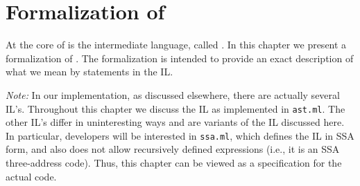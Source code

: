 \chapter{Formalization of \bil}

At the core of \bap is the \bap intermediate language, called \bil. In
this chapter we present a formalization of \bil. The formalization is
intended to provide an exact description of what we mean by statements
in the IL.

{\it Note:} In our implementation, as discussed elsewhere, there are
actually several IL's.  Throughout this chapter we discuss the IL as
implemented in {\tt ast.ml}.  The other IL's differ in uninteresting
ways and are variants of the IL discussed here. In particular,
developers will be interested in {\tt ssa.ml}, which defines the IL in
SSA form, and also does not allow recursively defined expressions
(i.e., it is an SSA three-address code).  Thus, this chapter can be
viewed as a specification for the actual code.





%
%
%

